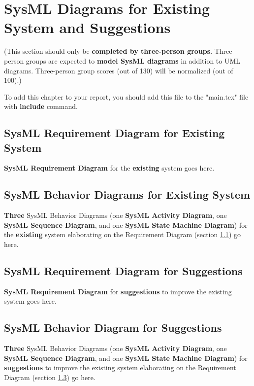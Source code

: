 \chapter{SysML Diagrams for Existing System and Suggestions} \label{sysml}
(This section should only be \textbf{completed by three-person groups}. Three-person groups are expected to \textbf{model SysML diagrams} in addition to UML diagrams. Three-person group scores (out of 130) will be normalized (out of 100).) 

To add this chapter to your report, you should add this file to the "main.tex" file with \textbf{include} command.

\section{SysML Requirement Diagram for Existing System } \label{sysmlreqdiagram}

\textbf{SysML Requirement Diagram} for the \textbf{existing} system goes here.

\section{SysML Behavior Diagrams for Existing System}

\textbf{Three} SysML Behavior Diagrams (one \textbf{SysML Activity Diagram}, one \textbf{SysML Sequence Diagram}, and one \textbf{SysML State Machine Diagram}) for the \textbf{existing} system elaborating on the Requirement Diagram (section \ref{sysmlreqdiagram}) go here. 

\section{SysML Requirement Diagram for Suggestions} \label{sysmlreqdiagramsuggest}

\textbf{SysML Requirement Diagram} for \textbf{suggestions} to improve the existing system goes here.

\section{SysML Behavior Diagram for Suggestions}

\textbf{Three} SysML Behavior Diagrams (one \textbf{SysML Activity Diagram}, one \textbf{SysML Sequence Diagram}, and one \textbf{SysML State Machine Diagram}) for \textbf{suggestions} to improve the existing system elaborating on the Requirement Diagram (section \ref{sysmlreqdiagramsuggest}) go here. 
